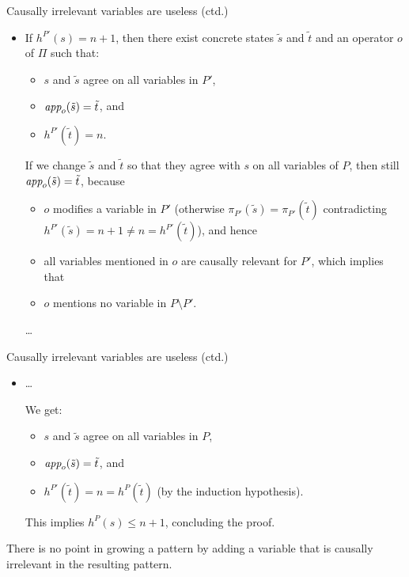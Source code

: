 \documentclass{gkibeamer}
\begin{document}
\begin{frame}{Causally irrelevant variables are useless (ctd.)}
  \begin{proofmid}
    \begin{itemize}
    \item {}

      If $h^{P'}(s) = n+1$, then there exist concrete states $\tilde{s}$
      and $\tilde{t}$ and an operator $o$ of $\Pi$ such that:
      \begin{itemize}
      \item $s$ and $\tilde{s}$ agree on all variables in $P'$,
      \item $\textit{app}_{o}(\tilde{s}) = \tilde{t}$, and
      \item $h^{P'}(\tilde{t}) = n$.
      \end{itemize}

      \pause

      If we change $\tilde{s}$ and $\tilde{t}$ so that they agree
      with $s$ on all variables of $P$, then still
      $\textit{app}_{o}(\tilde{s}) = \tilde{t}$, because
      \begin{itemize}
      \item $o$ modifies a variable in $P'$ (otherwise
        $\pi_{P'}(\tilde{s}) = \pi_{P'}(\tilde{t})$ contradicting
        $h^{P'}(\tilde{s}) = n + 1 \neq n = h^{P'}(\tilde{t})$), and
        hence
      \item all variables mentioned in $o$ are causally relevant for
        $P'$, which implies that
      \item $o$ mentions no variable in $P \setminus P'$.
      \end{itemize}
      \dots
    \end{itemize}
  \end{proofmid}
\end{frame}

\begin{frame}{Causally irrelevant variables are useless (ctd.)}
  \begin{proofend}
    \begin{itemize}
    \item \dots

      We get:
      \begin{itemize}
      \item $s$ and $\tilde{s}$ agree on all variables in $P$,
      \item $\textit{app}_{o}(\tilde{s}) = \tilde{t}$, and
      \item $h^{P'}(\tilde{t}) = n = h^P(\tilde{t})$ (by the induction
        hypothesis).
      \end{itemize}
      This implies $h^P(s) \le n + 1$, concluding the proof.
    \end{itemize}
  \end{proofend}

   There is no point in growing a pattern by adding
  a variable that is causally irrelevant in the resulting pattern.
\end{frame}
\end{document}
